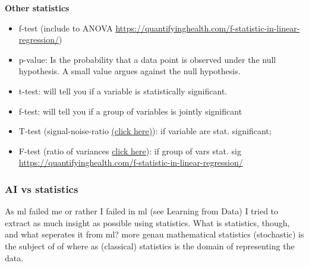 \textbf{Other statistics}
\begin{itemize}
    \item f-test (include to ANOVA \url{https://quantifyinghealth.com/f-statistic-in-linear-regression/})
    \item p-value: Is the probability that a data point is observed under the null hypothesis. A small value argues against the null hypothesis. 
    \item t-test: will tell you if a variable is statistically significant. 
    \item f-test: will tell you if a group of variables is jointly significant
    \item T-test (signal-noise-ratio \href{https://statisticsbyjim.com/hypothesis-testing/t-tests-1-sample-2-sample-paired-t-tests/}{(click here)}): if variable are stat. significant; 
    \item F-test (ratio of variances \href{https://statisticsbyjim.com/anova/f-tests-anova/}{click here}): if group of vars stat. sig \url{https://quantifyinghealth.com/f-statistic-in-linear-regression/}
\end{itemize}

\subsubsection{AI vs statistics}
As \gls{ml} failed me or rather I failed in \gls{ml} (see Learning from Data) I tried to extract as much insight as possible using statistics. 
What is statistics, though, and what seperates it from \gls{ml}? 
more genau mathematical statistics (stochastic)\cite{haertler2014statistisch} is the subject of of  where as (classical) statistics is the domain of representing the data. 

